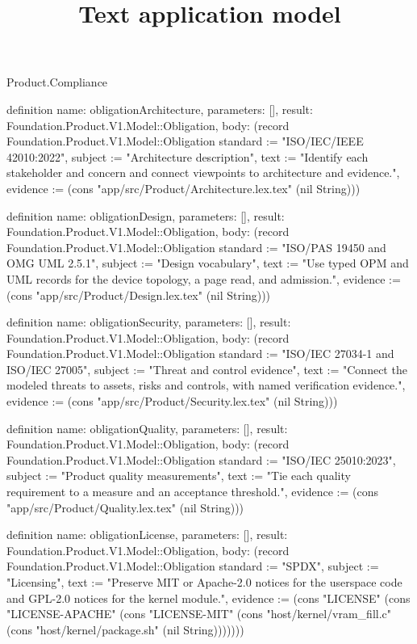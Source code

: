 \begin{lexlean}{Product.Compliance}
\title{Text application model}
\begin{semanticmodule}
definition{
  name: obligationArchitecture, parameters: [], result: Foundation.Product.V1.Model::Obligation,
  body: (record Foundation.Product.V1.Model::Obligation {standard := "ISO/IEC/IEEE 42010:2022", subject := "Architecture description", text := "Identify each stakeholder and concern and connect viewpoints to architecture and evidence.", evidence := (cons "app/src/Product/Architecture.lex.tex" (nil String))})
}

definition{
  name: obligationDesign, parameters: [], result: Foundation.Product.V1.Model::Obligation,
  body: (record Foundation.Product.V1.Model::Obligation {standard := "ISO/PAS 19450 and OMG UML 2.5.1", subject := "Design vocabulary", text := "Use typed OPM and UML records for the device topology, a page read, and admission.", evidence := (cons "app/src/Product/Design.lex.tex" (nil String))})
}

definition{
  name: obligationSecurity, parameters: [], result: Foundation.Product.V1.Model::Obligation,
  body: (record Foundation.Product.V1.Model::Obligation {standard := "ISO/IEC 27034-1 and ISO/IEC 27005", subject := "Threat and control evidence", text := "Connect the modeled threats to assets, risks and controls, with named verification evidence.", evidence := (cons "app/src/Product/Security.lex.tex" (nil String))})
}

definition{
  name: obligationQuality, parameters: [], result: Foundation.Product.V1.Model::Obligation,
  body: (record Foundation.Product.V1.Model::Obligation {standard := "ISO/IEC 25010:2023", subject := "Product quality measurements", text := "Tie each quality requirement to a measure and an acceptance threshold.", evidence := (cons "app/src/Product/Quality.lex.tex" (nil String))})
}

definition{
  name: obligationLicense, parameters: [], result: Foundation.Product.V1.Model::Obligation,
  body: (record Foundation.Product.V1.Model::Obligation {standard := "SPDX", subject := "Licensing", text := "Preserve MIT or Apache-2.0 notices for the userspace code and GPL-2.0 notices for the kernel module.", evidence := (cons "LICENSE" (cons "LICENSE-APACHE" (cons "LICENSE-MIT" (cons "host/kernel/vram_fill.c" (cons "host/kernel/package.sh" (nil String))))))})
}
\end{semanticmodule}
\end{lexlean}
